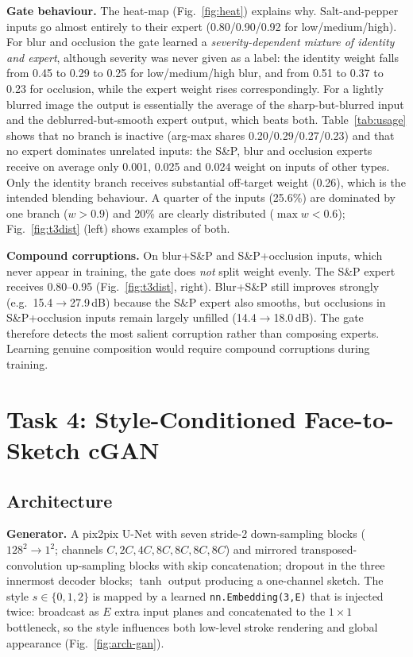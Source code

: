 \documentclass[conference]{IEEEtran}
\newcommand{\inputif}[1]{\IfFileExists{generated/#1}{}{\textit{[table \detokenize{#1} pending]}}}
\begin{document}
\textbf{Gate behaviour.} The heat-map (Fig.~\ref{fig:heat}) explains why. Salt-and-pepper inputs go almost entirely to their expert (0.80/0.90/0.92 for low/medium/high). For blur and occlusion the gate learned a \emph{severity-dependent mixture of identity and expert}, although severity was never given as a label: the identity weight falls from 0.45 to 0.29 to 0.25 for low/medium/high blur, and from 0.51 to 0.37 to 0.23 for occlusion, while the expert weight rises correspondingly. For a lightly blurred image the output is essentially the average of the sharp-but-blurred input and the deblurred-but-smooth expert output, which beats both. Table~\ref{tab:usage} shows that no branch is inactive (arg-max shares 0.20/0.29/0.27/0.23) and that no expert dominates unrelated inputs: the S\&P, blur and occlusion experts receive on average only 0.001, 0.025 and 0.024 weight on inputs of other types. Only the identity branch receives substantial off-target weight (0.26), which is the intended blending behaviour. A quarter of the inputs (25.6\%) are dominated by one branch ($w>0.9$) and 20\% are clearly distributed ($\max w<0.6$); Fig.~\ref{fig:t3dist} (left) shows examples of both.

\textbf{Compound corruptions.} On blur+S\&P and S\&P+occlusion inputs, which never appear in training, the gate does \emph{not} split weight evenly. The S\&P expert receives 0.80--0.95 (Fig.~\ref{fig:t3dist}, right). Blur+S\&P still improves strongly (e.g.\ 15.4$\to$27.9\,dB) because the S\&P expert also smooths, but occlusions in S\&P+occlusion inputs remain largely unfilled (14.4$\to$18.0\,dB). The gate therefore detects the most salient corruption rather than composing experts. Learning genuine composition would require compound corruptions during training.


\inputif{compare.tex}

\section{Task 4: Style-Conditioned Face-to-Sketch cGAN}
\subsection{Architecture}
\textbf{Generator.} A pix2pix U-Net with seven stride-2 down-sampling blocks ($128^2\to1^2$; channels $C,2C,4C,8C,8C,8C,8C$) and mirrored transposed-convolution up-sampling blocks with skip concatenation; dropout in the three innermost decoder blocks; $\tanh$ output producing a one-channel sketch. The style $s\in\{0,1,2\}$ is mapped by a learned \texttt{nn.Embedding(3,E)} that is injected twice: broadcast as $E$ extra input planes and concatenated to the $1{\times}1$ bottleneck, so the style influences both low-level stroke rendering and global appearance (Fig.~\ref{fig:arch-gan}).
\end{document}

